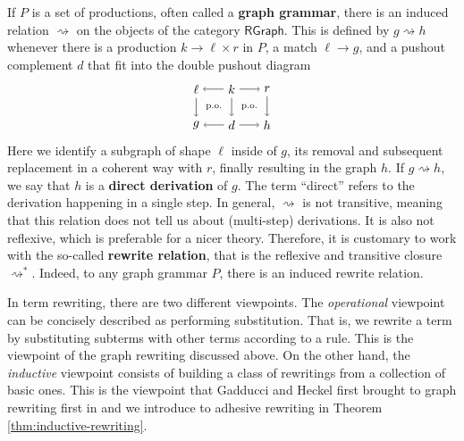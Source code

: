 \documentclass{amsart}
\newcommand{\RGraph}{\cat{RGraph}}
\newcommand{\defn}[1]{\textbf{#1}}
\newcommand{\cat}[1]{\mathsf{#1}}
\newcommand{\dderiv}[2]{#1 \rightsquigarrow #2}
\newcommand{\deriv}[2]{#1 \rightsquigarrow^\ast #2}
\newcommand{\spn}[3]{#2 \to #1 \times #3}
\theoremstyle{remark}
\theoremstyle{definition}
\begin{document}
If $ P $ is a set of productions, often called a \defn{graph grammar},
there is an induced relation $ \dderiv{}{} $ on the objects of the
category $ \RGraph $. This is defined by $ \dderiv{g}{h} $ whenever
there is a production $ \spn{\ell}{k}{r} $ in $ P $, a match
$ \ell \to g $, and a pushout complement $ d $ that fit into the
double pushout diagram
%
\[
  \begin{tikzpicture}
    \node (1) at (0,1) {$ \ell $};
    \node (2) at (1,1) {$ k $};
    \node (3) at (2,1) {$ r $};
    \node (4) at (0,0) {$ g $};
    \node (5) at (1,0) {$ d $};
    \node (6) at (2,0) {$ h $};
    \draw [->] (2) to node [] {\scriptsize{$  $}} (1);
    \draw [->] (2) to node [] {\scriptsize{$  $}} (3);
    \draw [->] (5) to node [] {\scriptsize{$  $}} (4);
    \draw [->] (5) to node [] {\scriptsize{$  $}} (6);
    \draw [->] (1) to node [] {\scriptsize{$  $}} (4);
    \draw [->] (2) to node [] {\scriptsize{$  $}} (5);
    \draw [->] (3) to node [] {\scriptsize{$  $}} (6);
    \node () at (0.5,0.5) {\scriptsize{p.o.}};
    \node () at (1.5,0.5) {\scriptsize{p.o.}};
  \end{tikzpicture}
\]
%
Here we identify a subgraph of shape $ \ell $ inside of $ g $, its
removal and subsequent replacement in a coherent way with $ r $,
finally resulting in the graph $ h $. If $ \dderiv{g}{h} $, we say
that $ h $ is a \defn{direct derivation} of $ g $. The term ``direct''
refers to the derivation happening in a single step.  In general,
$ \dderiv{}{} $ is not transitive, meaning that this relation does not
tell us about (multi-step) derivations. It is also not reflexive,
which is preferable for a nicer theory.  Therefore, it is customary to
work with the so-called \defn{rewrite relation}, that is the reflexive
and transitive closure $ \deriv{}{} $. Indeed, to any graph grammar
$ P $, there is an induced rewrite relation.

In term rewriting, there are two different viewpoints. The
\emph{operational} viewpoint can be concisely described as performing
substitution. That is, we rewrite a term by substituting subterms with
other terms according to a rule. This is the viewpoint of the graph
rewriting discussed above.  On the other hand, the \emph{inductive}
viewpoint consists of building a class of rewritings from a collection
of basic ones.  This is the viewpoint that Gadducci and Heckel first
brought to graph rewriting first in \cite{Gadd_IndGraphTrans}
and we introduce to adhesive rewriting in Theorem \ref{thm:inductive-rewriting}.
\end{document}
